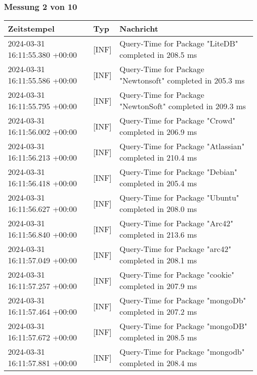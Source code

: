     \subsubsection*{Messung 2 von 10} \label{subsubsec:MySQLOhneIndex2von10}
        {
            {\small
                \begin{tabularx}{\textwidth}{|l|l|X|}
                    \hline
                    \textbf{Zeitstempel} & \textbf{Typ} & \textbf{Nachricht} \\
                    \hline
                    \endhead
                    2024-03-31 16:11:55.380 +00:00 & [INF] & Query-Time for Package "LiteDB" completed in 208.5 ms \\
                    2024-03-31 16:11:55.586 +00:00 & [INF] & Query-Time for Package "Newtonsoft" completed in 205.3 ms \\
                    2024-03-31 16:11:55.795 +00:00 & [INF] & Query-Time for Package "NewtonSoft" completed in 209.3 ms \\
                    2024-03-31 16:11:56.002 +00:00 & [INF] & Query-Time for Package "Crowd" completed in 206.9 ms \\
                    2024-03-31 16:11:56.213 +00:00 & [INF] & Query-Time for Package "Atlassian" completed in 210.4 ms \\
                    2024-03-31 16:11:56.418 +00:00 & [INF] & Query-Time for Package "Debian" completed in 205.4 ms \\
                    2024-03-31 16:11:56.627 +00:00 & [INF] & Query-Time for Package "Ubuntu" completed in 208.0 ms \\
                    2024-03-31 16:11:56.840 +00:00 & [INF] & Query-Time for Package "Arc42" completed in 213.6 ms \\
                    2024-03-31 16:11:57.049 +00:00 & [INF] & Query-Time for Package "arc42" completed in 208.1 ms \\
                    2024-03-31 16:11:57.257 +00:00 & [INF] & Query-Time for Package "cookie" completed in 207.9 ms \\
                    2024-03-31 16:11:57.464 +00:00 & [INF] & Query-Time for Package "mongoDb" completed in 207.2 ms \\
                    2024-03-31 16:11:57.672 +00:00 & [INF] & Query-Time for Package "mongoDB" completed in 208.5 ms \\
                    2024-03-31 16:11:57.881 +00:00 & [INF] & Query-Time for Package "mongodb" completed in 208.4 ms \\

\end{tabularx}}}
